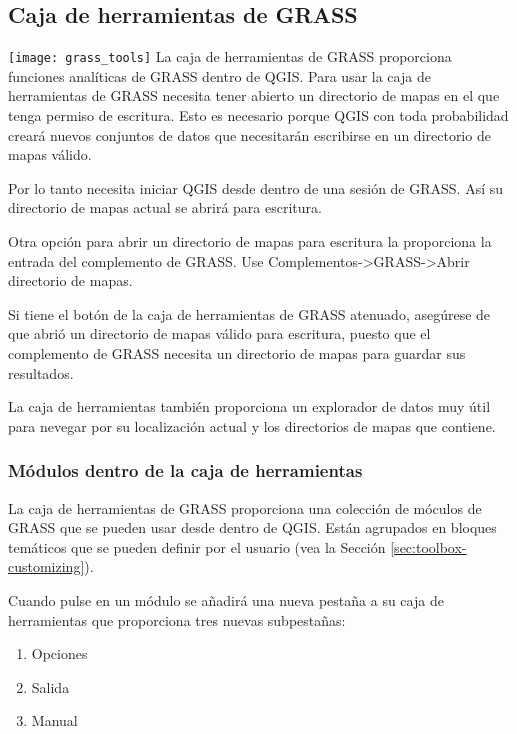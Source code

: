 \subsection{Caja de herramientas de GRASS}

\texttt{[image: grass\_tools]} La caja de herramientas de GRASS proporciona funciones analíticas de GRASS dentro de QGIS. Para usar la caja de herramientas de GRASS necesita tener abierto un directorio de mapas en el que tenga permiso de escritura. Esto es necesario porque QGIS con toda probabilidad creará nuevos conjuntos de datos que necesitarán escribirse en un directorio de mapas válido.

Por lo tanto necesita iniciar QGIS desde dentro de una sesión de GRASS. Así su  directorio de mapas actual se abrirá para escritura.

Otra opción para abrir un directorio de mapas para escritura la proporciona la entrada del complemento de GRASS. Use Complementos->GRASS->Abrir directorio de mapas.

Si tiene el botón de la caja de herramientas de GRASS atenuado, asegúrese de que abrió un directorio de mapas válido para escritura, puesto que el complemento de GRASS necesita un directorio de mapas para guardar sus resultados.

La caja de herramientas también proporciona un explorador de datos muy útil para nevegar por su localización actual y los directorios de mapas que contiene.


\subsubsection{Módulos dentro de la caja de herramientas} 

La caja de herramientas de GRASS proporciona una colección de móculos de GRASS que se pueden usar desde dentro de QGIS. Están agrupados en bloques temáticos que se pueden definir por el usuario (vea la Sección \ref{sec:toolbox-customizing}).

Cuando pulse en un módulo se añadirá una nueva pestaña a su caja de herramientas que proporciona tres nuevas subpestañas:
\begin{enumerate}
\item Opciones
\item Salida 
\item Manual
\end{enumerate}


